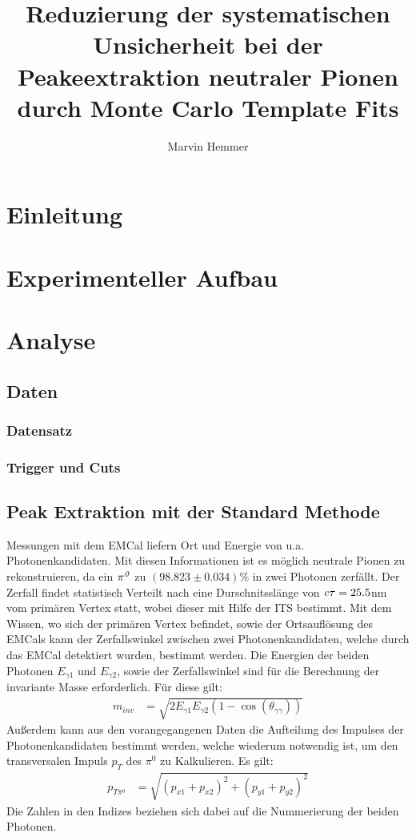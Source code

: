 \documentclass[]{article}
\title{Reduzierung der systematischen Unsicherheit bei der Peakeextraktion neutraler Pionen durch Monte Carlo Template Fits}
\author{Marvin Hemmer}
\begin{document}
\maketitle
\newpage
\tableofcontents
\newpage

	\section{Einleitung}

	\section{Experimenteller Aufbau}

	\section{Analyse}
	\subsection{Daten}
	\subsubsection{Datensatz}
	\subsubsection{Trigger und Cuts}
	\subsection{Peak Extraktion mit der Standard Methode}
	Messungen mit dem EMCal liefern Ort und Energie von u.a. Photonenkandidaten. Mit diesen Informationen ist es m{\"o}glich neutrale Pionen zu rekonstruieren, da ein ${\it \pi^{0}}$ zu $\left( 98.823\pm0.034\right)\%$ in zwei Photonen zerf{\"a}llt. Der Zerfall findet statistisch Verteilt nach eine Durschnitssl{\"a}nge von ${\it c\tau} = 25.5$nm vom prim{\"a}ren Vertex statt, wobei dieser mit Hilfe der ITS bestimmt.
	Mit dem Wissen, wo sich der prim{\"a}ren Vertex befindet, sowie der Ortsaufl{\"o}sung des EMCals kann der Zerfallswinkel zwischen zwei Photonenkandidaten, welche durch das EMCal detektiert wurden, bestimmt werden.
	Die Energien der beiden Photonen $E_{\gamma1}$ und $E_{\gamma2}$, sowie der Zerfallswinkel sind f{\"u}r die Berechnung der invariante Masse erforderlich. F{\"u}r diese gilt:
	\begin{align}
	\label{eq_invmass}
	m_{inv} &= \sqrt{2E_{\gamma1}E_{\gamma2}(1-\cos\left( \theta_{\gamma\gamma}\right) )} 
	\end{align}
	Au{\ss}erdem kann aus den vorangegangenen Daten die Aufteilung des Impulses der Photonenkandidaten bestimmt werden, welche wiederum notwendig ist, um den transversalen Impuls $p_{T}$ des $\pi^{0}$ zu Kalkulieren.
	Es gilt:
	\begin{align}
	\label{eq_pt}
	p_{T\pi^{0}} &= \sqrt{\left(p_{x1}+p_{x2}\right)^{2} +\left(p_{y1}+p_{y2}\right)^{2}} 
	\end{align}
	Die Zahlen in den Indizes beziehen sich dabei auf die Nummerierung der beiden Photonen.
	
\end{document}
